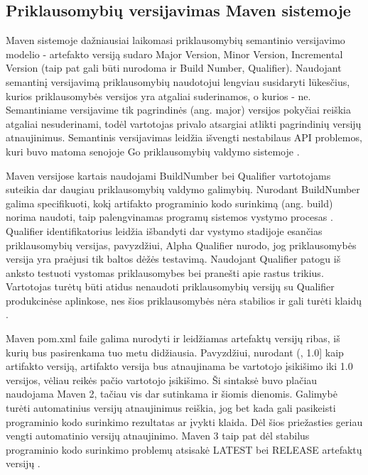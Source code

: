 \subsection{Priklausomybių versijavimas Maven sistemoje}

Maven sistemoje dažniausiai laikomasi priklausomybių semantinio versijavimo modelio -
artefakto versiją sudaro Major Version, Minor Version, Incremental Version
(taip pat gali būti nurodoma ir Build Number, Qualifier). Naudojant semantinį versijavimą priklausomybių naudotojui
lengviau susidaryti lūkesčius, kurios priklausomybės versijos yra atgaliai suderinamos, o kurios - ne. Semantiniame versijavime
tik pagrindinės (ang. major) versijos pokyčiai reiškia atgaliai nesuderinami, todėl vartotojas privalo atsargiai
atlikti pagrindinių versijų atnaujinimus. Semantinis versijavimas leidžia išvengti nestabilaus API problemos, kuri buvo matoma
senojoje Go priklausomybių valdymo sistemoje \cite{ORACLEa}.

Maven versijose kartais naudojami BuildNumber bei Qualifier vartotojams suteikia dar daugiau priklausomybių valdymo galimybių.
Nurodant BuildNumber galima specifikuoti, kokį artifakto programinio kodo surinkimą (ang. build) norima naudoti, taip palengvinamas
programų sistemos vystymo procesas \cite{ORACLEa}. Qualifier identifikatorius leidžia išbandyti dar vystymo stadijoje
esančias priklausomybių versijas, pavyzdžiui, Alpha Qualifier nurodo, jog priklausomybės versija yra praėjusi tik baltos
dėžės testavimą. Naudojant Qualifier patogu iš anksto testuoti vystomas priklausomybes bei pranešti apie rastus trikius.
Vartotojas turėtų būti atidus nenaudoti priklausomybių versijų su Qualifier produkcinėse aplinkose, nes šios priklausomybės nėra
stabilios ir gali turėti klaidų \cite{VB14}.

Maven pom.xml faile galima nurodyti ir leidžiamas artefaktų versijų ribas, iš kurių bus pasirenkama tuo metu didžiausia.
Pavyzdžiui, nurodant (,  1.0] kaip artifakto versiją, artifakto versija bus atnaujinama be vartotojo įsikišimo iki 1.0 versijos,
vėliau reikės pačio vartotojo įsikišimo. Ši sintaksė buvo plačiau naudojama Maven 2, tačiau vis dar sutinkama ir šiomis dienomis.
Galimybė turėti automatinius versijų atnaujinimus reiškia, jog bet kada gali pasikeisti programinio kodo surinkimo rezultatas ar
įvykti klaida. Dėl šios priežasties geriau vengti automatinio versijų atnaujinimo. Maven 3 taip pat dėl stabilus programinio kodo
surinkimo problemų atsisakė LATEST bei RELEASE artefaktų versijų \cite{LIG18}.
